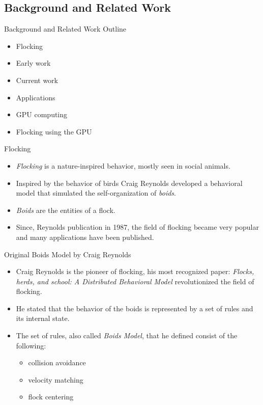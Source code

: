\documentclass[red]{beamer}
\begin{document}
\subsection{Background and Related Work}

\begin{frame}{Background and Related Work Outline}
	\begin{itemize}
		\pause \item Flocking
		\pause \item Early work
		\pause \item Current work
		\pause \item Applications
		\pause \item GPU computing
		\pause \item Flocking using the GPU
	\end{itemize}
\end{frame}

\begin{frame}{Flocking}
	\begin{itemize}
		\pause \item \textit{Flocking} is a nature-inspired behavior, mostly seen in social animals.
		\pause \item Inspired by the behavior of birds Craig Reynolds developed a behavioral model that simulated the self-organization of \textit{boids}.
		\pause \item \textit{Boids} are the entities of a flock.
		\pause \item Since, Reynolds publication in 1987, the field of flocking became very popular and many applications have been published.
	\end{itemize}
\end{frame}

\begin{frame}{Original Boids Model by Craig Reynolds}
	\begin{itemize}
		\pause \item Craig Reynolds is the pioneer of flocking, his most recognized paper: \textit{Flocks, herds, and school: A Distributed Behavioral Model} revolutionized the field of flocking.
		\pause \item He stated that the behavior of the boids is represented by a set of rules and its internal state.
		\pause \item The set of rules, also called \textit{Boids Model}, that he defined consist of the following:
			\begin{itemize}
				\pause \item collision avoidance
				\pause \item velocity matching
				\pause \item flock centering
			\end{itemize}
	\end{itemize}
\end{frame}
\end{document}

